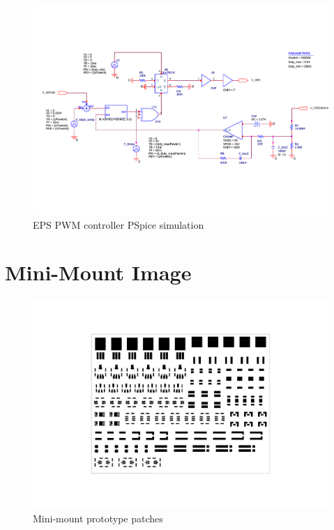 \begin{figure}
\centering
\includegraphics[scale=0.8]{figures/fig_CDR_PSpice_PWM}
\caption{\ac{EPS} \ac{PWM} controller PSpice simulation}
\label{fig:PSpice_PWM}
\end{figure}
%
\newpage

\section{Mini-Mount Image}
\label{app:EPS_mini-mount}
%
\begin{figure}
\centering
\includegraphics[scale=1]{figures/fig_CDR_Mini-mounts}
\caption{Mini-mount prototype patches}
\label{fig:mini-mount}
\end{figure}
%
